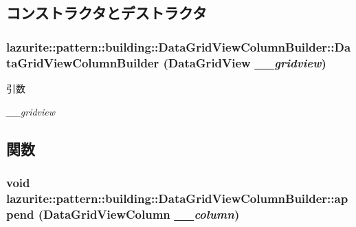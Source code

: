 \subsection{コンストラクタとデストラクタ}
\hypertarget{classlazurite_1_1pattern_1_1building_1_1_data_grid_view_column_builder_abb177bf444b5568f8c9444a3cc584d96}{
\subsubsection[{DataGridViewColumnBuilder}]{\setlength{\rightskip}{0pt plus 5cm}lazurite::pattern::building::DataGridViewColumnBuilder::DataGridViewColumnBuilder (DataGridView {\em \_\-\_\-gridview})}}
\label{classlazurite_1_1pattern_1_1building_1_1_data_grid_view_column_builder_abb177bf444b5568f8c9444a3cc584d96}

\begin{DoxyParams}{引数}
\item[{\em \_\-\_\-gridview}]\end{DoxyParams}


\subsection{関数}
\hypertarget{classlazurite_1_1pattern_1_1building_1_1_data_grid_view_column_builder_a5600475d4e77c99aad1100974e57c15a}{
\subsubsection[{append}]{\setlength{\rightskip}{0pt plus 5cm}void lazurite::pattern::building::DataGridViewColumnBuilder::append (DataGridViewColumn {\em \_\-\_\-column})}}
\label{classlazurite_1_1pattern_1_1building_1_1_data_grid_view_column_builder_a5600475d4e77c99aad1100974e57c15a}


